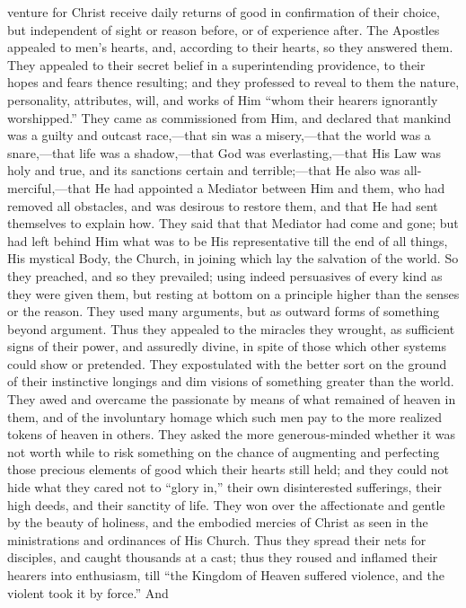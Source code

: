 venture for Christ receive daily returns of good in confirmation of
their choice, but independent of sight or reason before, or of
experience after. The Apostles appealed to men's hearts, and,
according to their hearts, so they answered them. They appealed to
their secret belief in a superintending providence, to their hopes and
fears thence resulting; and they professed to reveal to them the
nature, personality, attributes, will, and works of Him
``whom their hearers ignorantly worshipped.'' They came as
commissioned from Him, and declared that mankind was a guilty and
outcast race,—that sin was a misery,—that the world was a snare,—that
life was a shadow,—that God was everlasting,—that His Law was holy
and true, and its sanctions certain and terrible;—that He also was
all-merciful,—that He had appointed a Mediator between Him and them,
who had removed all obstacles, and was desirous to restore them, and
that He had sent themselves to explain how. They said that that
Mediator had come and gone; but had left behind Him what was to be His
representative till the end of all things, His mystical Body, the
Church, in joining which lay the salvation of the world. So they
preached, and so they prevailed; using indeed persuasives of every
kind as they were given them, but resting at bottom on a principle
higher than the senses or the reason. They used many arguments, but as
outward forms of something beyond argument. Thus they appealed to the
miracles they wrought, as sufficient signs of their power, and
assuredly divine, in spite of those which other systems could show or
pretended. They expostulated with the better sort on the ground of
their instinctive longings and dim visions of something greater than
the world. They awed and overcame the passionate by means of what
remained of heaven in them, and of the involuntary homage which such
men pay to the more realized tokens of heaven in others. They asked
the more generous-minded whether it was not worth while to risk
something on the chance of augmenting and perfecting those
precious elements of good which their hearts still held; and they
could not hide what they cared not to ``glory in,'' their own
disinterested sufferings, their high deeds, and their sanctity of
life. They won over the affectionate and gentle by the beauty of
holiness, and the embodied mercies of Christ as seen in the
ministrations and ordinances of His Church. Thus they spread their
nets for disciples, and caught thousands at a cast; thus they roused
and inflamed their hearers into enthusiasm, till ``the Kingdom of
Heaven suffered violence, and the violent took it by force.'' And
